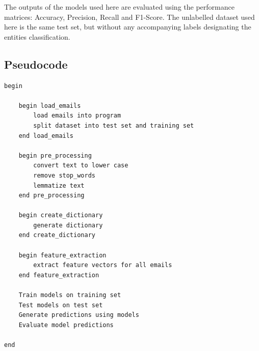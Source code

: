 \documentclass[11pt, a4paper]{article}
\begin{document}
The outputs of the models used here are evaluated using the performance matrices: Accuracy, Precision, Recall and F1-Score. The unlabelled dataset used here is the same test set, but without any accompanying labels designating the entities classification.

\subsection{Pseudocode}

\begin{lstlisting}[frame=single]
begin

    begin load_emails
        load emails into program
        split dataset into test set and training set
    end load_emails
	
    begin pre_processing
        convert text to lower case
        remove stop_words
        lemmatize text
    end pre_processing
	
    begin create_dictionary
        generate dictionary
    end create_dictionary
	
    begin feature_extraction
        extract feature vectors for all emails
    end feature_extraction
	
    Train models on training set
    Test models on test set
    Generate predictions using models
    Evaluate model predictions
    
end
\end{lstlisting}
\newpage
\end{document}
